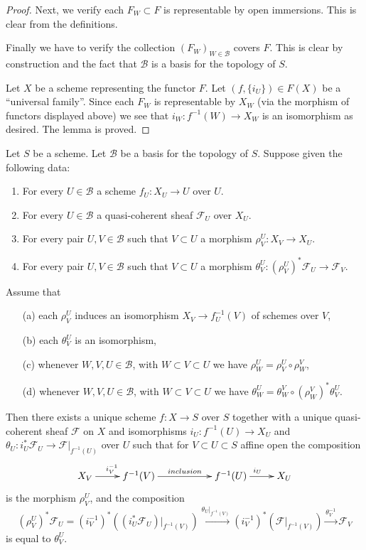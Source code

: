 \begin{proof}
\medskip\noindent
Next, we verify each $F_W \subset F$ is representable by open immersions.
This is clear from the definitions.

\medskip\noindent
Finally we have to verify
the collection $(F_W)_{W \in \mathcal{B}}$ covers $F$.
This is clear by construction and the fact that $\mathcal{B}$ is
a basis for the topology of $S$.

\medskip\noindent
Let $X$ be a scheme representing the functor $F$.
Let $(f, \{i_U\}) \in F(X)$ be a ``universal family''.
Since each $F_W$ is representable by $X_W$ (via the morphism of functors
displayed above) we see that $i_W : f^{-1}(W) \to X_W$
is an isomorphism as desired. The lemma is proved.
\end{proof}

\begin{lemma}
\label{lemma-relative-glueing-sheaves}
Let $S$ be a scheme.
Let $\mathcal{B}$ be a basis for the topology of $S$.
Suppose given the following data:
\begin{enumerate}
\item For every $U \in \mathcal{B}$ a scheme $f_U : X_U \to U$ over $U$.
\item For every $U \in \mathcal{B}$ a quasi-coherent sheaf $\mathcal{F}_U$
over $X_U$.
\item For every pair $U, V \in \mathcal{B}$ such that
$V \subset U$ a morphism $\rho^U_V : X_V \to X_U$.
\item  For every pair $U, V \in \mathcal{B}$ such that
$V \subset U$ a morphism
$\theta^U_V : (\rho^U_V)^*\mathcal{F}_U \to \mathcal{F}_V$.
\end{enumerate}
Assume that
\begin{enumerate}
\item[(a)] each $\rho^U_V$ induces an isomorphism
$X_V \to f_U^{-1}(V)$ of schemes over $V$,
\item[(b)] each $\theta^U_V$ is an isomorphism,
\item[(c)] whenever $W, V, U \in \mathcal{B}$, with
$W \subset V \subset U$ we have $\rho^U_W = \rho^U_V \circ \rho ^V_W$,
\item[(d)] whenever $W, V, U \in \mathcal{B}$, with
$W \subset V \subset U$ we have
$\theta^U_W = \theta^V_W \circ (\rho^V_W)^*\theta^U_V$.
\end{enumerate}
Then there exists a unique scheme $f : X \to S$ over $S$
together with a unique quasi-coherent sheaf $\mathcal{F}$ on $X$
and isomorphisms $i_U : f^{-1}(U) \to X_U$ and
$\theta_U : i_U^*\mathcal{F}_U \to \mathcal{F}|_{f^{-1}(U)}$
over $U$ such that
for $V \subset U \subset S$ affine open the composition
$$
\xymatrix{
X_V \ar[r]^{i_V^{-1}} &
f^{-1}(V) \ar[rr]^{inclusion} & &
f^{-1}(U) \ar[r]^{i_{U}} &
X_U
}
$$
is the morphism $\rho^U_V$, and the composition
\begin{equation}
\label{equation-glue}
(\rho^U_V)^*\mathcal{F}_U
=
(i_V^{-1})^*((i_U^*\mathcal{F}_U)|_{f^{-1}(V)})
\xrightarrow{\theta_U|_{f^{-1}(V)}}
(i_V^{-1})^*(\mathcal{F}|_{f^{-1}(V)})
\xrightarrow{\theta_V^{-1}}
\mathcal{F}_V
\end{equation}
is equal to $\theta^U_V$.
\end{lemma}

